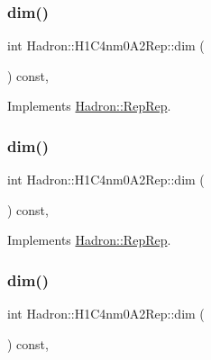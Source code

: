 \subsubsection{\texorpdfstring{dim()}{dim()}\hspace{0.1cm}{\footnotesize\ttfamily [3/5]}}
{\footnotesize\ttfamily int Hadron\+::\+H1\+C4nm0\+A2\+Rep\+::dim (\begin{DoxyParamCaption}{ }\end{DoxyParamCaption}) const\hspace{0.3cm}{\ttfamily [inline]}, {\ttfamily [virtual]}}



Implements \mbox{\hyperlink{structHadron_1_1RepRep_a92c8802e5ed7afd7da43ccfd5b7cd92b}{Hadron\+::\+Rep\+Rep}}.

\mbox{\label{structHadron_1_1H1C4nm0A2Rep_afb094239f1c82d0594c2591d818ee1fa}} 
\subsubsection{\texorpdfstring{dim()}{dim()}\hspace{0.1cm}{\footnotesize\ttfamily [4/5]}}
{\footnotesize\ttfamily int Hadron\+::\+H1\+C4nm0\+A2\+Rep\+::dim (\begin{DoxyParamCaption}{ }\end{DoxyParamCaption}) const\hspace{0.3cm}{\ttfamily [inline]}, {\ttfamily [virtual]}}



Implements \mbox{\hyperlink{structHadron_1_1RepRep_a92c8802e5ed7afd7da43ccfd5b7cd92b}{Hadron\+::\+Rep\+Rep}}.

\mbox{\label{structHadron_1_1H1C4nm0A2Rep_afb094239f1c82d0594c2591d818ee1fa}} 
\subsubsection{\texorpdfstring{dim()}{dim()}\hspace{0.1cm}{\footnotesize\ttfamily [5/5]}}
{\footnotesize\ttfamily int Hadron\+::\+H1\+C4nm0\+A2\+Rep\+::dim (\begin{DoxyParamCaption}{ }\end{DoxyParamCaption}) const\hspace{0.3cm}{\ttfamily [inline]}, {\ttfamily [virtual]}}



